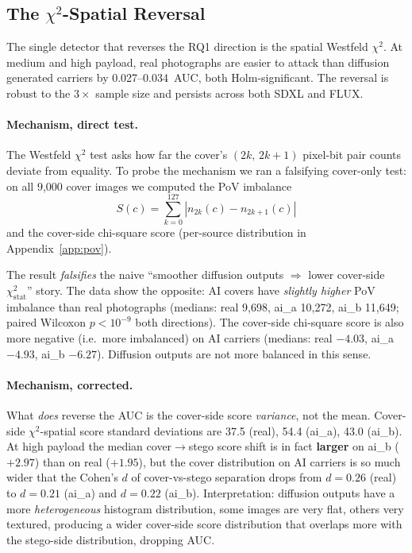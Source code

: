 \documentclass[10pt,twocolumn,a4paper]{article}
\begin{document}
\subsection{The $\chi^2$-Spatial Reversal}
\label{sec:chi2spatial}

The single detector that reverses the RQ1 direction is the spatial Westfeld $\chi^2$. At medium and high payload, real photographs are easier to attack than diffusion generated carriers by 0.027--0.034~AUC, both Holm-significant. The reversal is robust to the $3\!\times\!$ sample size and persists across both SDXL and FLUX.

\paragraph{Mechanism, direct test.} The Westfeld $\chi^2$ test asks how far the cover's $(2k,\,2k\!+\!1)$ pixel-bit pair counts deviate from equality. To probe the mechanism we ran a falsifying cover-only test: on all 9{,}000 cover images we computed the PoV imbalance
\begin{equation}
S(c) = \sum_{k=0}^{127} |n_{2k}(c) - n_{2k+1}(c)|
\label{eq:pov-imbalance}
\end{equation}
\noindent and the cover-side chi-square score (per-source distribution in Appendix~\ref{app:pov}).

The result \emph{falsifies} the naive ``smoother diffusion outputs $\Rightarrow$ lower cover-side $\chi^2_\text{stat}$'' story. The data show the opposite: AI covers have \emph{slightly higher} PoV imbalance than real photographs (medians: real 9{,}698, ai\_a 10{,}272, ai\_b 11{,}649; paired Wilcoxon $p\!<\!10^{-9}$ both directions). The cover-side chi-square score is also more negative (i.e.\ more imbalanced) on AI carriers (medians: real $-4.03$, ai\_a $-4.93$, ai\_b $-6.27$). Diffusion outputs are not more balanced in this sense.

\paragraph{Mechanism, corrected.} What \emph{does} reverse the AUC is the cover-side score \emph{variance}, not the mean. Cover-side $\chi^2$-spatial score standard deviations are 37.5 (real), 54.4 (ai\_a), 43.0 (ai\_b). At high payload the median cover$\to$stego score shift is in fact \textbf{larger} on ai\_b ($+2.97$) than on real ($+1.95$), but the cover distribution on AI carriers is so much wider that the Cohen's $d$ of cover-vs-stego separation drops from $d\!=\!0.26$ (real) to $d\!=\!0.21$ (ai\_a) and $d\!=\!0.22$ (ai\_b). Interpretation: diffusion outputs have a more \emph{heterogeneous} histogram distribution, some images are very flat, others very textured, producing a wider cover-side score distribution that overlaps more with the stego-side distribution, dropping AUC.
\end{document}
